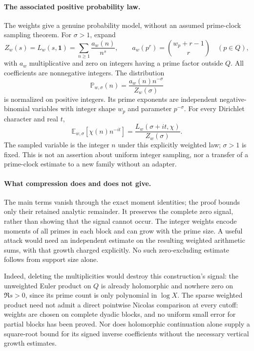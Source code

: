 \documentclass[11pt]{article}
\theoremstyle{definition}
\begin{document}
\paragraph{The associated positive probability law.}
The weights give a genuine probability model, without an
assumed prime-clock sampling theorem. For $\sigma>1$, expand
\[
 Z_w(s)=L_w(s,\boldsymbol1)
       =\sum_{n\ge1}\frac{a_w(n)}{n^s},\qquad
 a_w(p^r)=\binom{w_p+r-1}{r}\quad(p\in Q),
\]
with $a_w$ multiplicative and zero on integers having a prime
factor outside $Q$. All coefficients are nonnegative integers.
The distribution
\[
 \mathbb P_{w,\sigma}(n)=
       \frac{a_w(n)n^{-\sigma}}{Z_w(\sigma)}
\]
is normalized on positive integers. Its prime exponents are
independent negative-binomial variables with integer shape
$w_p$ and parameter $p^{-\sigma}$. For every Dirichlet
character and real $t$,
\[
 \mathbb E_{w,\sigma}[\chi(n)n^{-it}]
       =\frac{L_w(\sigma+it,\chi)}{Z_w(\sigma)}.
\]
The sampled variable is the integer $n$ under this explicitly
weighted law; $\sigma>1$ is fixed. This is not an assertion
about uniform integer sampling, nor a transfer of a
prime-clock estimate to a new family without an adapter.

\paragraph{What compression does and does not give.}
The main terms vanish through the exact moment identities;
the proof bounds only their retained analytic remainder.
It preserves the complete zero signal, rather than showing
that the signal cannot occur. The integer weights encode
moments of all primes in each block and can grow with the
prime size. A useful attack would need an independent estimate
on the resulting weighted arithmetic sums, with that growth
charged explicitly. No such zero-excluding estimate follows
from support size alone.

Indeed, deleting the multiplicities would destroy this
construction's signal: the unweighted Euler product on $Q$
is already holomorphic and nowhere zero on $\Re s>0$, since
its prime count is only polynomial in $\log X$.
The sparse weighted product need not admit a direct
pointwise Nicolas comparison at every cutoff: weights are
chosen on complete dyadic blocks, and no uniform small
error for partial blocks has been proved. Nor does
holomorphic continuation alone supply a square-root bound
for its signed inverse coefficients without the necessary
vertical growth estimates.
\end{document}
